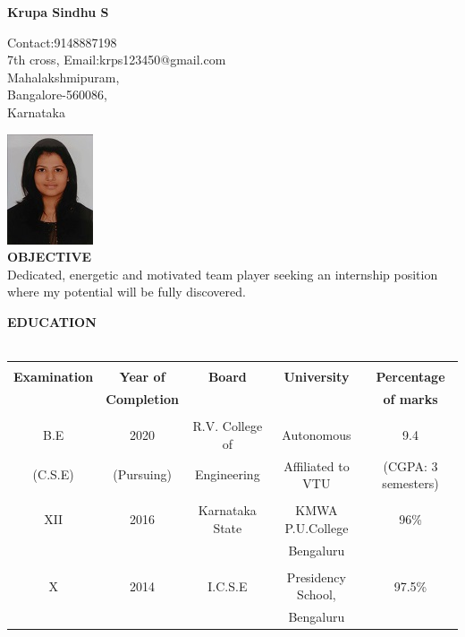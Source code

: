 \documentclass[letterpaper,11pt,oneside]{article}
\begin{document}
\begin{center}
\textbf{{\large Krupa Sindhu S}}\\
\end{center}
\vspace{-2ex}
\noindent\hrulefill
\vspace{1ex}

\small { \hfill  {Contact:9148887198}\\
	{7th cross,} \hfill  {Email:krps123450@gmail.com}\\
	{Mahalakshmipuram},\\
	{Bangalore-560086,}\\
	{Karnataka}}

 \hfill \includegraphics[scale=0.7]{krupa.jpg}\\
 
 \noindent\textbf{{\normalsize  OBJECTIVE}}\\
 \small {Dedicated, energetic and motivated team player seeking an internship position where my potential will be fully discovered.\\}
 
 \noindent\textbf{{\normalsize  EDUCATION}}\\
 \\
 \begin{tabular}{ |c|c|c|c|c| } 
 	\hline
 	&&&&\\ 
 	\textbf{\large{Examination}} & \textbf{\large{Year of}} & \textbf{\large{Board}} & \textbf{\large{University}} & \textbf{\large{Percentage}} \\
 	& \textbf{Completion} & &  &\textbf{of marks}  \\
 	\hline
 	&&&&\\ 
 	B.E&2020 &R.V. College of & Autonomous  & 9.4\\   
 	(C.S.E)  &  (Pursuing) & Engineering &Affiliated to VTU   &(CGPA: 3 semesters) \\
 	\hline
 	&&&&\\ 
 	XII &2016  & Karnataka State & KMWA P.U.College &  96\% \\
 	&  & & Bengaluru & \\
 	\hline
 	&&&&\\ 
 	X & 2014   & I.C.S.E & Presidency School, & 97.5\% \\
 	&  & & Bengaluru & \\
 	\hline
 \end{tabular}
\end{document}

